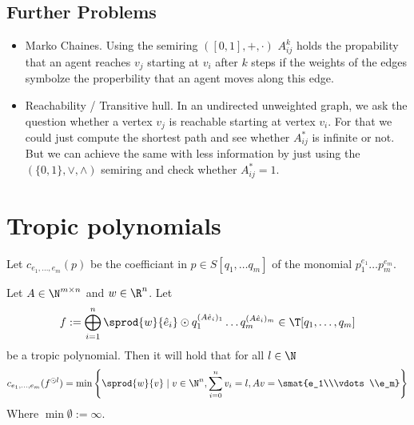 \subsection{Further Problems}
\begin{itemize}
    \item Marko Chaines. Using the semiring $([0, 1], +, \cdot)$ $A^k_{ij}$ holds the propability that an agent reaches $v_j$ starting at $v_i$ after $k$ steps if the weights of the edges symbolze the properbility that an agent moves along this edge.
    \item Reachability / Transitive hull. In an undirected unweighted graph, we ask the question whether a vertex $v_j$ is reachable starting at vertex $v_i$. For that we could just compute the shortest path and see whether $A^*_{ij}$ is infinite or not. But we can achieve the same with less information by just using the $(\{0, 1\}, \lor, \land)$ semiring and check whether $A^*_{ij} = 1$.
\end{itemize}


\section{Tropic polynomials}
Let $c_{e_1, \dots, e_m}(p)$ be the coefficiant in $p \in S[q_1, \dots q_m]$ of the monomial $p_1^{e_1}\dots p_m^{e_m}$. 

\begin{lemma}
    \label{lemma:prem_trop_poly}
    Let $A \in \N^{m \times n}$ and $w \in \R^n$. Let
    $$f := \bigoplus_{i=1}^{n} \sprod{w}{\hat e_i}\odot  q_1^{(A\hat e_i)_1}\dots q_m^{(A\hat e_i)_m} \in \T[q_1, \dots, q_m]$$
    be a tropic polynomial. Then it will hold that for all $l \in \N$
    $$c_{e_1, \dots, e_m}(f^{\odot l}) = \min\left\{\sprod{w}{v} \mid v \in \N^n, \sum_{i=0}^{n}v_i = l, Av=\smat{e_1\\\vdots\\e_m}\right\}$$
    Where $\min\emptyset:=\infty$.
\end{lemma}

